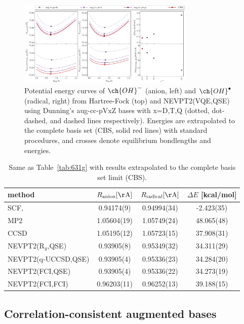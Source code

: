 \documentclass[aps,pra,twocolumn]{revtex4-2}
\newcommand{\OHradical}{\ch{OH}^\bullet}
\newcommand{\OHanion}{\ch{OH}^-}
\begin{document}
\begin{figure}[t!]
\includegraphics[width=0.75\textwidth]{../nevpt2/cbs_extrapolation/fig.pdf}
\caption{Potential energy curves of $\OHanion$ (anion, left) and  $\OHradical$ (radical, right) from Hartree-Fock (top) and NEVPT2(VQE,QSE)
using Dunning's aug-cc-pVxZ bases with x=D,T,Q (dotted, dot-dashed, and dashed lines respectively). 
Energies are extrapolated to the complete basis set (CBS, solid red lines) with standard procedures, and crosses denote equilibrium bondlengths and energies.}
\label{figure:dunning}
\end{figure}

\begin{table}[t!]
\begin{tabular}{lccc}
\hline\hline
method & $R_{\mathrm{anion}} [\mathrm{\AA}]$ & $R_{\mathrm{radical}} [\mathrm{\AA}]$ & $\Delta E$ [kcal/mol] \\ \hline
SCF,       & 0.94174(9) & 0.94994(34) & -2.423(35) \\
\hline
MP2 & 1.05604(19) & 1.05749(24) & 48.065(48) \\
CCSD & 1.05195(12) & 1.05723(15) & 37.908(31) \\
\hline
NEVPT2(R$_y$,QSE) & 0.93905(8) & 0.95349(32) & 34.311(29) \\
NEVPT2(q-UCCSD,QSE) & 0.93905(4) & 0.95336(23) & 34.284(20) \\
NEVPT2(FCI,QSE) & 0.93905(4) & 0.95336(22) & 34.273(19) \\
NEVPT2(FCI,FCI) & 0.96203(11) & 0.96252(13) & 39.188(15) \\
\hline\hline
\end{tabular}
\caption{Same as Table~\ref{tab:631g} with results extrapolated to the complete basis set limit (CBS).}
\label{tab:cbs}
\end{table}

\subsection{Correlation-consistent augmented bases}
\end{document}
